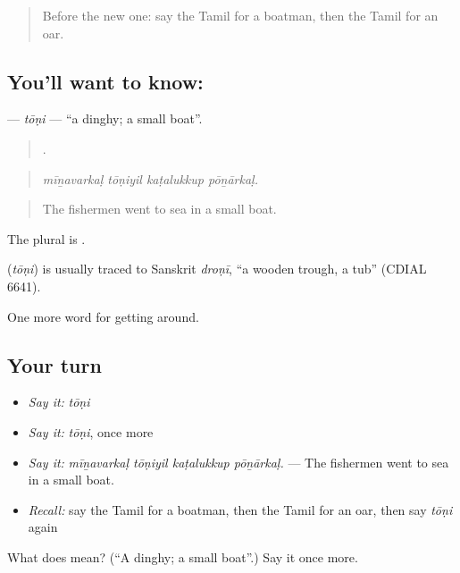 \begin{quote}
Before the new one: say the Tamil for a boatman, then the Tamil for an oar.
\end{quote}

\subsection*{You'll want to know: }
\textbf{} — \emph{tōṇi} — \textquotedblleft{}a dinghy; a small boat\textquotedblright{}.

\begin{quote}
   .
\end{quote}

\begin{quote}
\emph{mīṉavarkaḷ tōṇiyil kaṭalukkup pōṉārkaḷ.}
\end{quote}

\begin{quote}
The fishermen went to sea in a small boat.
\end{quote}

The plural is .

\begin{cousinweb}
\textbf{} (\emph{tōṇi}) is usually traced to Sanskrit \emph{droṇī}, \textquotedblleft{}a wooden trough, a tub\textquotedblright{} (CDIAL 6641).
\end{cousinweb}

\begin{grammarlens}[title={What you've built}]
One more word for getting around.
\end{grammarlens}

\subsection*{Your turn}
\begin{itemize}
\raggedright
  \item \emph{Say it:} \emph{tōṇi}
  \item \emph{Say it:} \emph{tōṇi}, once more
  \item \emph{Say it:} \emph{mīṉavarkaḷ tōṇiyil kaṭalukkup pōṉārkaḷ.} — The fishermen went to sea in a small boat.
  \item \emph{Recall:} say the Tamil for a boatman, then the Tamil for an oar, then say \emph{tōṇi} again
\end{itemize}

\begin{tcolorbox}[breakable,colback=teal!4,colframe=teal!35!black,title={Before you move on}]
What does  mean? (\textquotedblleft{}A dinghy; a small boat\textquotedblright{}.) Say it once more.
\end{tcolorbox}
